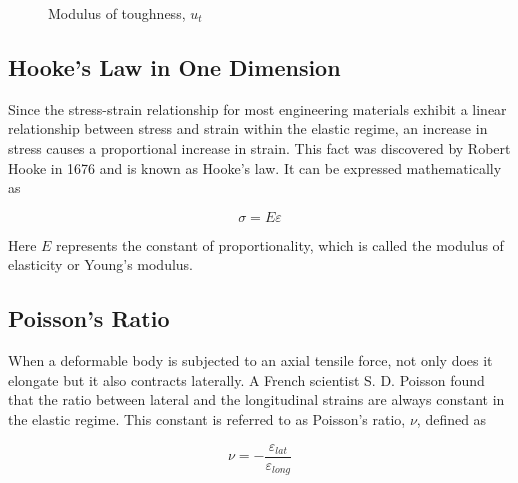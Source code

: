 \documentclass[
10pt,
a4paper,
openany,
svgnames,
]{kaobook} %
\begin{document}
\begin{figure}[H]
  \centering
  \caption{Modulus of toughness, $u_t$}
  \label{fig: modulus of resilience}
\end{figure}

\subsection{Hooke’s Law in One Dimension}

Since the stress-strain relationship for most engineering materials exhibit a linear relationship between stress and strain within the elastic regime, an increase in stress causes a proportional increase in strain. This fact was discovered by Robert Hooke in 1676 and is known as Hooke’s law. It can be expressed mathematically as

\begin{equation}
  \sigma  = E\varepsilon
\end{equation}

Here $E$ represents the constant of proportionality, which is called the modulus of elasticity or Young’s modulus.

\subsection{Poisson’s Ratio}

When a deformable body is subjected to an axial tensile force, not only does it elongate but it also contracts laterally. A French scientist S. D. Poisson found that the ratio between lateral and the longitudinal strains are always constant in the elastic regime. This constant is referred to as Poisson’s ratio, $\nu$, defined as

\begin{equation}
  \nu  =  - \frac{\varepsilon _{lat}}{\varepsilon _{long}}
\end{equation}
  
\end{document}
